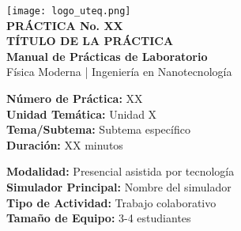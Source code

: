 \documentclass[12pt,a4paper]{article}
\newcommand{\practicenumber}{XX} %
\newcommand{\practicetitle}{TÍTULO DE LA PRÁCTICA} %
\newcommand{\practiceunit}{Unidad X} %
\newcommand{\practicesubtopic}{Subtema específico} %
\newcommand{\practiceduration}{XX minutos} %
\newcommand{\practicemodality}{Presencial asistida por tecnología} %
\newcommand{\practicesimulator}{Nombre del simulador} %
\begin{document}
	
	
	\begin{center}
		\texttt{[image: logo\_uteq.png]}\\[0.3cm]
		
		{\LARGE \textcolor{uteqblue}{\textbf{PRÁCTICA No. \practicenumber}}}\\[0.2cm]
		{\Huge \textcolor{uteqblue}{\textbf{\practicetitle}}}\\[0.3cm]
		{\large \textcolor{uteqgray}{\textbf{Manual de Prácticas de Laboratorio}}}\\[0.2cm]
		{\normalsize \textcolor{uteqgray}{Física Moderna | Ingeniería en Nanotecnología}}\\[0.5cm]
	\end{center}
	
	
	\begin{datosgeneralesbox}
		\begin{multicols}{2}
			\textbf{Número de Práctica:} \practicenumber\\
			\textbf{Unidad Temática:} \practiceunit\\
			\textbf{Tema/Subtema:} \practicesubtopic\\
			\textbf{Duración:} \practiceduration\\
			
			\columnbreak
			
			\textbf{Modalidad:} \practicemodality\\
			\textbf{Simulador Principal:} \practicesimulator\\
			\textbf{Tipo de Actividad:} Trabajo colaborativo\\
			\textbf{Tamaño de Equipo:} 3-4 estudiantes\\
		\end{multicols}
	\end{datosgeneralesbox}
	
	
\end{document}
